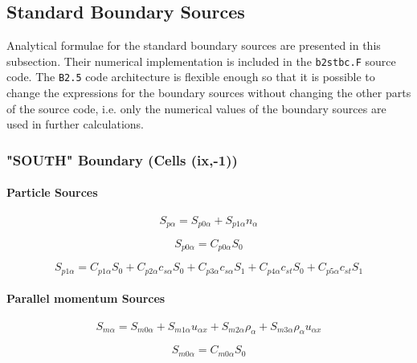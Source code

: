 \documentclass[a4paper,10pt]{report}
\begin{document}
\subsection{Standard Boundary Sources}

Analytical formulae for the standard boundary sources are presented in this
subsection. Their numerical implementation is included in the {\tt b2stbc.F}
source code. The {\tt B2.5} code architecture is flexible enough so
that it is possible to change the expressions for the boundary sources
without changing the other parts of the source code, i.e. only the
numerical values of the boundary sources are used in further
calculations.

\subsubsection{"SOUTH" Boundary (Cells (ix,-1))}

\paragraph{Particle Sources}

\begin{equation}
S_{p\alpha}=S_{p0\alpha}+S_{p1\alpha}n_{\alpha}   \label{21}
\end{equation}

\begin{equation}
S_{p0\alpha}=C_{p0\alpha}S_{0}   \label{22}
\end{equation}

\begin{equation}
S_{p1\alpha}=C_{p1\alpha}S_{0}+C_{p2\alpha}c_{s\alpha}S_{0}+C_{p3\alpha}
c_{s\alpha}S_{1}+C_{p4\alpha}c_{st}S_{0}+C_{p5\alpha}c_{st}S_{1}
\label{23}
\end{equation}

\paragraph{Parallel momentum Sources}

\begin{equation}
S_{m\alpha}=S_{m0\alpha}+S_{m1\alpha}u_{\alpha x}+S_{m2\alpha}\rho_{\alpha}
+S_{m3\alpha}\rho_{\alpha}u_{\alpha x}   \label{24}
\end{equation}

\begin{equation}
S_{m0\alpha}=C_{m0\alpha}S_{0}   \label{25}
\end{equation}
\end{document}
